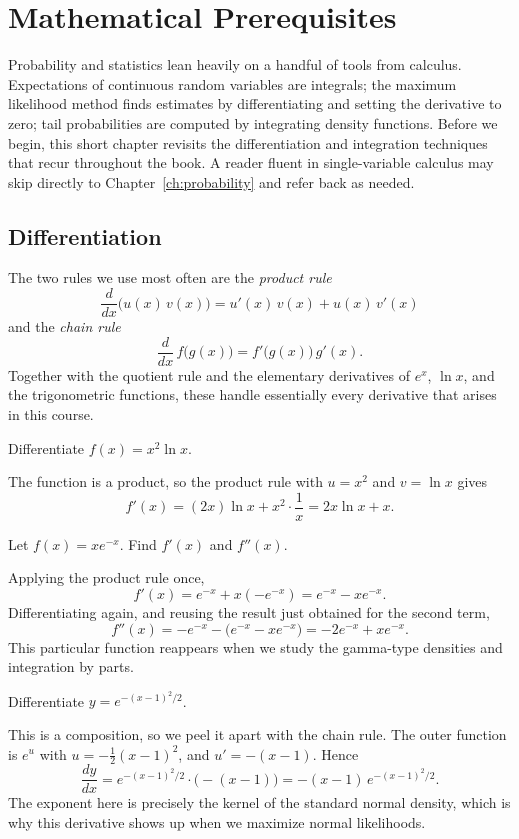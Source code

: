\chapter{Mathematical Prerequisites}
\label{ch:prereq}

Probability and statistics lean heavily on a handful of tools from calculus.
Expectations of continuous random variables are integrals; the maximum
likelihood method finds estimates by differentiating and setting the
derivative to zero; tail probabilities are computed by integrating density
functions. Before we begin, this short chapter revisits the differentiation
and integration techniques that recur throughout the book. A reader fluent in
single-variable calculus may skip directly to Chapter~\ref{ch:probability} and
refer back as needed.

\section{Differentiation}

The two rules we use most often are the \emph{product rule}
\[
  \frac{d}{dx}\bigl(u(x)\,v(x)\bigr) = u'(x)\,v(x) + u(x)\,v'(x)
\]
and the \emph{chain rule}
\[
  \frac{d}{dx}\,f\bigl(g(x)\bigr) = f'\bigl(g(x)\bigr)\,g'(x).
\]
Together with the quotient rule and the elementary derivatives of $e^x$,
$\ln x$, and the trigonometric functions, these handle essentially every
derivative that arises in this course.

\begin{example}
Differentiate $f(x) = x^2 \ln x$.

\solution The function is a product, so the product rule with $u=x^2$ and
$v=\ln x$ gives
\[
  f'(x) = (2x)\ln x + x^2\cdot\frac{1}{x} = 2x\ln x + x.
\]
\end{example}

\begin{example}
Let $f(x) = x e^{-x}$. Find $f'(x)$ and $f''(x)$.

\solution Applying the product rule once,
\[
  f'(x) = e^{-x} + x(-e^{-x}) = e^{-x} - xe^{-x}.
\]
Differentiating again, and reusing the result just obtained for the second
term,
\[
  f''(x) = -e^{-x} - \bigl(e^{-x} - xe^{-x}\bigr)
         = -2e^{-x} + xe^{-x}.
\]
This particular function reappears when we study the gamma-type densities and
integration by parts.
\end{example}

\begin{example}
Differentiate $y = e^{-(x-1)^2/2}$.

\solution This is a composition, so we peel it apart with the chain rule. The
outer function is $e^{u}$ with $u = -\tfrac12(x-1)^2$, and $u' = -(x-1)$. Hence
\[
  \frac{dy}{dx} = e^{-(x-1)^2/2}\cdot\bigl(-(x-1)\bigr)
              = -(x-1)\,e^{-(x-1)^2/2}.
\]
The exponent here is precisely the kernel of the standard normal density,
which is why this derivative shows up when we maximize normal likelihoods.
\end{example}

